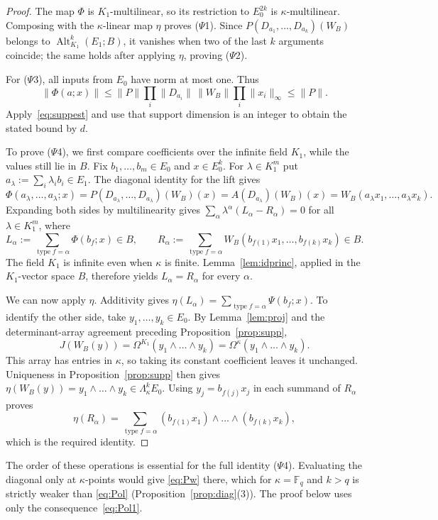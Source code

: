 \documentclass[11pt]{amsart}
\theoremstyle{definition}
\theoremstyle{remark}
\numberwithin{equation}{section}
\newcommand{\F}{\mathbb F}
\newcommand{\Alt}{\operatorname{Alt}}
\newcommand{\norm}[1]{\lVert #1\rVert}
\newcommand{\type}{\operatorname{type}}
\begin{document}
\begin{proof}
The map $\Phi$ is $K_1$\nobreakdash-multilinear, so its restriction to $E_0^{2k}$ is $\kappa$\nobreakdash-multilinear.
Composing with the $\kappa$\nobreakdash-linear map $\eta$ proves ($\Psi$1). Since
$P(D_{a_1},\dots,D_{a_k})(W_B)$ belongs to $\Alt^k_{K_1}(E_1;B)$, it vanishes when two of the last $k$ arguments
coincide; the same holds after applying $\eta$, proving ($\Psi$2).

For ($\Psi$3), all inputs from $E_0$ have norm at most one. Thus
\[
\norm{\Phi(a;x)}\le\norm P\prod_i\norm{D_{a_i}}\,\norm{W_B}\prod_i\norm{x_i}_\infty\le\norm P.
\]
Apply~\eqref{eq:suppest} and use that support dimension is an integer to obtain the stated bound by $d$.

To prove ($\Psi$4), we first compare coefficients over the infinite field $K_1$, while the values still lie in
$B$. Fix $b_1,\dots,b_m\in E_0$ and $x\in E_0^k$. For $\lambda\in K_1^m$ put
$a_\lambda:=\sum_i\lambda_ib_i\in E_1$. The diagonal identity for the lift gives
\[
\Phi(a_\lambda,\dots,a_\lambda;x)
=P(D_{a_\lambda},\dots,D_{a_\lambda})(W_B)(x)
=A(D_{a_\lambda})(W_B)(x)
=W_B(a_\lambda x_1,\dots,a_\lambda x_k).
\]
Expanding both sides by multilinearity gives
$\sum_\alpha\lambda^\alpha(L_\alpha-R_\alpha)=0$ for all $\lambda\in K_1^m$, where
\[
L_\alpha:=\sum_{\type f=\alpha}\Phi(b_f;x)\in B,\qquad
R_\alpha:=\sum_{\type f=\alpha}W_B(b_{f(1)}x_1,\dots,b_{f(k)}x_k)\in B.
\]
The field $K_1$ is infinite even when $\kappa$ is finite. Lemma~\ref{lem:idprinc}, applied in the
$K_1$\nobreakdash-vector space $B$, therefore yields $L_\alpha=R_\alpha$ for every $\alpha$.

We can now apply $\eta$. Additivity gives
$\eta(L_\alpha)=\sum_{\type f=\alpha}\Psi(b_f;x)$. To identify the other side, take $y_1,\dots,y_k\in E_0$.
By Lemma~\ref{lem:proj} and the determinant-array agreement preceding Proposition~\ref{prop:supp},
\[
J(W_B(y))=\Omega^{K_1}(y_1\wedge\dots\wedge y_k)
=\Omega^\kappa(y_1\wedge\dots\wedge y_k).
\]
This array has entries in $\kappa$, so taking its constant coefficient leaves it unchanged. Uniqueness in
Proposition~\ref{prop:supp} then gives
$\eta(W_B(y))=y_1\wedge\dots\wedge y_k\in\Lambda^k_\kappa E_0$.
Using $y_j=b_{f(j)}x_j$ in each summand of $R_\alpha$ proves
\[
\eta(R_\alpha)=\sum_{\type f=\alpha}(b_{f(1)}x_1)\wedge\dots\wedge(b_{f(k)}x_k),
\]
which is the required identity.
\end{proof}

The order of these operations is essential for the full identity ($\Psi$4). Evaluating the diagonal only at
$\kappa$\nobreakdash-points would give \eqref{eq:Pw} there, which for $\kappa=\F_q$ and $k>q$ is strictly weaker than
\eqref{eq:Pol} (Proposition~\ref{prop:diag}(3)). The proof below uses only the consequence~\eqref{eq:Pol1}.
\end{document}

